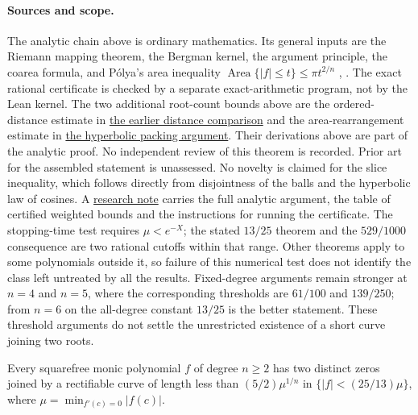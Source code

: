 \paragraph{Sources and scope.}
\label{bdry:low-critical-closure}
The analytic chain above is ordinary mathematics.  Its general inputs are the
Riemann mapping theorem, the Bergman kernel, the argument principle, the
coarea formula, and P\'olya's area inequality
$\operatorname{Area}\{|f|\le t\}\le\pi t^{2/n}$
\cite[printed pp.~280--282]{polya1928}, \cite[Theorem~1]{crane}.  The exact
rational certificate is checked by a separate exact-arithmetic program,
not by the Lean kernel. The two additional root-count bounds above are
the ordered-distance estimate in
\href{https://github.com/wcook04/plectis-erdos/blob/f36a98bf3d3e6f65f1074e3b800e3293d5b8a51a/ErdosProblems/Erdos1041/ClusterSeparationLowCriticalClosure.md}{the earlier distance comparison}
and the area-rearrangement estimate in
\href{https://github.com/wcook04/plectis-erdos/blob/f36a98bf3d3e6f65f1074e3b800e3293d5b8a51a/ErdosProblems/Erdos1041/HyperbolicPackingArityFloor.md}{the hyperbolic packing argument}.
Their derivations above are part of the analytic proof. No independent
review of this theorem is recorded. Prior art for
the assembled statement is unassessed. No novelty is claimed for the
slice inequality, which follows directly from disjointness of the balls
and the hyperbolic law of cosines.  A
\href{https://github.com/wcook04/plectis-erdos/blob/f36a98bf3d3e6f65f1074e3b800e3293d5b8a51a/ErdosProblems/Erdos1041/AngularBudgetLowCriticalClosure.md}{research note}
carries the full analytic argument, the table of certified weighted bounds
and the instructions for running the certificate. The stopping-time test
requires $\mu<e^{-X}$; the stated $13/25$ theorem and the $529/1000$
consequence are two rational cutoffs within that range. Other theorems
apply to some polynomials outside it, so failure of this numerical test
does not identify the class left untreated by all the results.
Fixed-degree arguments remain stronger at $n=4$ and $n=5$, where the
corresponding thresholds are $61/100$ and $139/250$; from $n=6$ on the
all-degree constant $13/25$ is the better statement.  These threshold
arguments do not settle the unrestricted existence of a short curve joining two roots.

\begin{remark}\label{res:scaled-low-critical-path}
Every squarefree monic polynomial $f$ of degree $n\ge2$ has two distinct
zeros joined by a rectifiable curve of length less than
$(5/2)\mu^{1/n}$ in $\{|f|<(25/13)\mu\}$, where
$\mu=\min_{f'(c)=0}|f(c)|$.
\end{remark}

